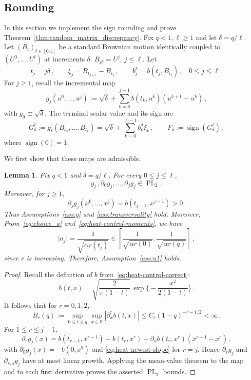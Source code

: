 \documentclass[11pt]{article}
\newtheorem{lemma}[theorem]{Lemma}
\theoremstyle{definition}
\theoremstyle{remark}
\numberwithin{equation}{section}
\numberwithin{theorem}{section}
\newcommand{\R}{\mathbb R}
\newcommand{\PL}{\operatorname{PL}}
\begin{document}
\subsection{Rounding}
\label{sec:rounding}
In this section we implement the sign rounding and prove Theorem~\ref{thm:random_matrix_discrepancy}.  
Fix $q<1, \ell\ge1$ and let $\delta=q/\ell$. Let $(B_{t})_{t \in [0,1]}$ be a standard Brownian motion identically coupled to $(U^0,\ldots,U^{\ell})$ at increments $\delta$: $B_{j\delta} = U^j$, $j \le \ell$. Let
\[
 t_j=j\delta\,,
 \qquad
 \xi_j= B_{t_{j+1}}-B_{t_j}\,,
 \qquad
 b_j^\delta=b(t_j,B_{t_j})\,,~~~~ 0 \le j \le \ell \,.
\]
For $j\ge1$, recall the incremental map
\begin{equation}\label{eq:terminal-incremental-map}
g_{j}(u^0,\ldots,u^j) := \sqrt{\delta} + \sum_{k=0}^{j-1} b(t_k,u^k)(u^{k+1}-u^k)\,,
\end{equation}
with $g_{0}\equiv\sqrt{\delta}$.  The terminal
scalar value and its sign are
\begin{equation}\label{eq:ideal-terminal-message}
 G_\delta^\ell
 := 
g_{\ell}(B_{t_0},\ldots,B_{t_\ell})
 =\sqrt{\delta} + 
 \sum_{k=0}^{\ell-1}b_k^\delta\xi_k\,,
 \qquad
 F_\delta:=\operatorname{sign}(G_\delta^\ell)\,,
\end{equation}
where $\operatorname{sign}(0)=1$.

We first show that these maps are admissible.
\begin{lemma}
\label{lem:heat-control-admissibility}
Fix $q<1$ and $\delta=q/\ell$. For every $0\le j\le\ell$,
\[
  g_{j}\,,
 \partial_0 g_{j},\ldots,
 \partial_j g_{j}\in\PL_2\,.
\]
Moreover, for $j\ge1$,
\begin{equation}\label{eq:heat-newest-slope}
 \partial_j g_{j}(x^0,\ldots,x^j) =b(t_{j-1},x^{j-1})>0\,.
\end{equation}
Thus Assumptions~\ref{ass:g} and \ref{ass:transversality} hold. 
Moreover, From~\eqref{eq:choice_a} and~\eqref{eq:heat-control-moments}, we have
\[\big|a_{j}\big| = \frac{1}{\sqrt{\alpha r(t_j)}}\in \left[\frac{1}{\sqrt{\alpha r(0)}},\frac{1}{\sqrt{\alpha r(q)}} \right]\,,\]
since $r$ is increasing. Therefore, Assumption~\ref{ass:a1} holds.
\end{lemma}

\begin{proof}
Recall the definition of $b$ from~\eqref{eq:heat-control-correct}:
\[b(t,x) = \sqrt{\frac{2}{\pi(1-t)}} \,\exp\Big\{-\frac{x^2}{2(1-t)}\Big\}\,.\]
It follows that for $r=0,1,2$,
\[
 B_r(q):=
 \sup_{0\le t\le q}\sup_{x\in\R}|\partial_x^rb(t,x)|
 \le C_r(1-q)^{-r-1/2}<\infty\,.
\]
For $1\le r\le j-1$,
\[
 \partial_r g_{j}(x)
 =b(t_{r-1},x^{r-1})-b(t_r,x^r)
 +\partial_xb(t_r,x^r)(x^{r+1}-x^r)\,,
\]
with $\partial_0 g_{j}(x) = - b(0,x^{0})$ and \eqref{eq:heat-newest-slope} for $r=j$. Hence $\partial_r g_j$ and $\partial_{r,s} g_j$ have at most linear growth. Applying the mean-value theorem to the map and to each first derivative proves the asserted $\PL_2$ bounds.
\end{proof}
\end{document}
